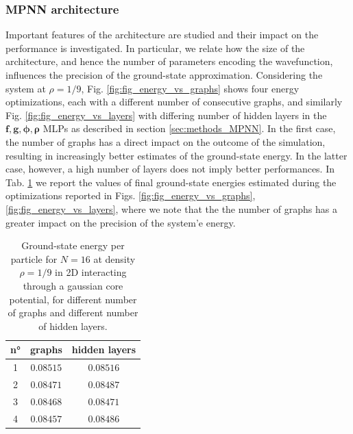 \documentclass[a4paper, 12pt, oneside]{article}
\begin{document}
\subsubsection*{MPNN architecture}
Important features of the architecture are studied and their impact on the performance 
is investigated. In particular, we relate how the size of the architecture, and hence the number of 
parameters encoding the wavefunction, influences the precision of the ground-state approximation.
Considering the system at $\rho=1/9$, Fig. \ref{fig:fig_energy_vs_graphs} shows four energy optimizations, each with a different number of consecutive graphs, 
and similarly Fig. \ref{fig:fig_energy_vs_layers} with differing number of hidden layers in the $\bm{f},\bm{g},\bm{\phi}, \bm{\rho}$ MLPs as described in section \ref{sec:methods_MPNN}. In the first case, 
the number of graphs has a direct impact on the outcome of the simulation, resulting in increasingly 
better estimates of the ground-state energy. In the latter case, however, a high number of layers does 
not imply better performances. In Tab. \ref{tab:tab2} we report the values of final ground-state 
energies estimated during the optimizations reported in Figs. \ref{fig:fig_energy_vs_graphs}, \ref{fig:fig_energy_vs_layers},
where we note that the the number of graphs has a greater impact on the precision of the system'e energy.

\begin{table}[H]%
    \centering
    \caption{\label{tab:tab2} Ground-state energy per particle for $N=16$ at density $\rho= 1/9$ in 2D interacting through a 
    gaussian core potential, for different 
    number of graphs and different number of hidden layers.}
    \begin{tabular}{|c|c|c|}
        \hline
        n° &  graphs & hidden layers \\
        \hline
        \hline
        1 & $0.08515$ & $0.08516$ \\
        \hline
        2 & $0.08471$ & $0.08487$ \\
        \hline
        3 & $0.08468$ & $0.08471$ \\
        \hline
        4 & $0.08457$ & $0.08486$ \\
        \hline
    \end{tabular}
\end{table}
\end{document}
